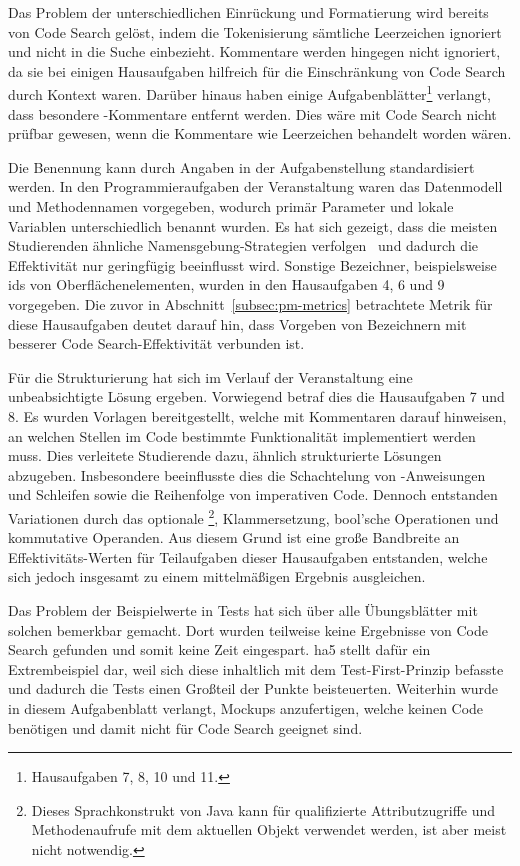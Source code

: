 Das Problem der unterschiedlichen Einrückung und Formatierung wird bereits von Code Search gelöst, indem die Tokenisierung sämtliche Leerzeichen ignoriert und nicht in die Suche einbezieht.
Kommentare werden hingegen nicht ignoriert, da sie bei einigen Hausaufgaben hilfreich für die Einschränkung von Code Search durch Kontext waren.
Darüber hinaus haben einige Aufgabenblätter\footnote{
    Hausaufgaben 7, 8, 10 und 11.
} verlangt, dass besondere -Kommentare entfernt werden.
Dies wäre mit Code Search nicht prüfbar gewesen, wenn die Kommentare wie Leerzeichen behandelt worden wären.

Die Benennung kann durch Angaben in der Aufgabenstellung standardisiert werden.
In den Programmieraufgaben der Veranstaltung waren das Datenmodell und Methodennamen vorgegeben, wodurch primär Parameter und lokale Variablen unterschiedlich benannt wurden.
Es hat sich gezeigt, dass die meisten Studierenden ähnliche Namensgebung-Strategien verfolgen~ und dadurch die Effektivität nur geringfügig beeinflusst wird.
Sonstige Bezeichner, beispielsweise \acp{id} von Oberflächenelementen, wurden in den Hausaufgaben 4, 6 und 9 vorgegeben.
Die zuvor in Abschnitt~\ref{subsec:pm-metrics} betrachtete Metrik für diese Hausaufgaben deutet darauf hin, dass Vorgeben von Bezeichnern mit besserer Code Search-Effektivität verbunden ist.

Für die Strukturierung hat sich im Verlauf der Veranstaltung eine unbeabsichtigte Lösung ergeben.
Vorwiegend betraf dies die Hausaufgaben 7 und 8.
Es wurden Vorlagen bereitgestellt, welche mit Kommentaren darauf hinweisen, an welchen Stellen im Code bestimmte Funktionalität implementiert werden muss.
Dies verleitete Studierende dazu, ähnlich strukturierte Lösungen abzugeben.
Insbesondere beeinflusste dies die Schachtelung von -Anweisungen und Schleifen sowie die Reihenfolge von imperativen Code.
Dennoch entstanden Variationen durch das optionale \footnote{
    Dieses Sprachkonstrukt von Java kann für qualifizierte Attributzugriffe und Methodenaufrufe mit dem aktuellen Objekt verwendet werden, ist aber meist nicht notwendig.
}, Klammersetzung, bool'sche Operationen und kommutative Operanden.
Aus diesem Grund ist eine große Bandbreite an Effektivitäts-Werten für Teilaufgaben dieser Hausaufgaben entstanden, welche sich jedoch insgesamt zu einem mittelmäßigen Ergebnis ausgleichen.

Das Problem der Beispielwerte in Tests hat sich über alle Übungsblätter mit solchen bemerkbar gemacht.
Dort wurden teilweise keine Ergebnisse von Code Search gefunden und somit keine Zeit eingespart.
\ac{ha}5 stellt dafür ein Extrembeispiel dar, weil sich diese inhaltlich mit dem Test-First-Prinzip befasste und dadurch die Tests einen Großteil der Punkte beisteuerten.
Weiterhin wurde in diesem Aufgabenblatt verlangt, Mockups anzufertigen, welche keinen Code benötigen und damit nicht für Code Search geeignet sind.

